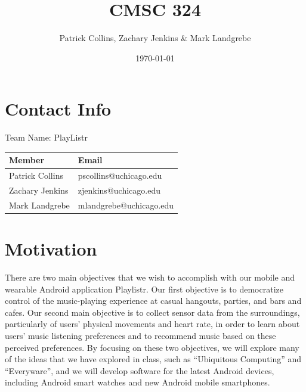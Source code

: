 \documentclass[12pt]{article}
\begin{document}
\title{CMSC 324}
\author{Patrick Collins, Zachary Jenkins \& Mark Landgrebe}
\date{\today}
\maketitle
\pagebreak

\section{Contact Info}
Team Name: PlayListr

\begin{center}
\begin{tabular}{l|l}
 Member           &  Email                    \\ \hline
 Patrick Collins  &  pscollins@uchicago.edu   \\
 Zachary Jenkins  &  zjenkins@uchicago.edu    \\
 Mark Landgrebe   &  mlandgrebe@uchicago.edu  \\
\end{tabular}
\end{center}

\pagebreak

\section{Motivation}

There are two main objectives that we wish to accomplish with our
mobile and wearable Android application Playlistr. Our first objective
is to democratize control of the music-playing experience at casual
hangouts, parties, and bars and cafes. Our second main objective is to
collect sensor data from the surroundings, particularly of users’
physical movements and heart rate, in order to learn about users’
music listening preferences and to recommend music based on these
perceived preferences. By focusing on these two objectives, we will
explore many of the ideas that we have explored in class, such as
“Ubiquitous Computing” and “Everyware”, and we will develop software
for the latest Android devices, including Android smart watches and
new Android mobile smartphones.
\end{document}
